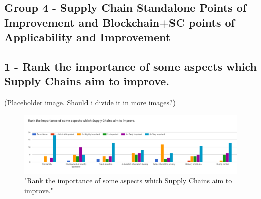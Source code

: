 
\subsection{Group 4 - Supply Chain Standalone Points of Improvement and Blockchain+SC points of Applicability and Improvement}




\subsection*{1 - Rank the importance of some aspects which Supply Chains aim to improve.}
 
(Placeholder image. Should i divide it in more images?)

\begin{figure}[h]
\centering
\includegraphics[scale=0.35]{media/importance_SC_improvement_points.png}
\caption["Rank the importance of some aspects which Supply Chains aim to improve."]{"Rank the importance of some aspects which Supply Chains aim to improve."}
\label{fig:importance_SC_improvement_points}
\end{figure}


